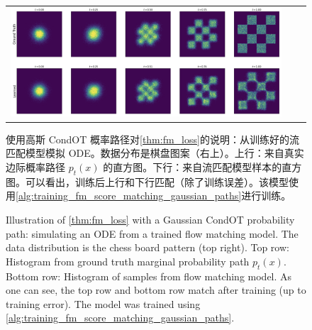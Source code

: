 \begin{figure}[!t]
    \centering
    \begin{tabular}{ccc}
         \includegraphics[width=\textwidth]{figures/conditional_marginal_path.png} &
    \end{tabular}
    \caption{\label{fig:fm_illustration_checkerboard}Illustration of \cref{thm:fm_loss} with a Gaussian CondOT probability path: simulating an ODE from a trained flow matching model. The data distribution is the chess board pattern (top right). Top row: Histogram from ground truth marginal probability path $p_t(x)$. Bottom row: Histogram of samples from flow matching model. As one can see, the top row and bottom row match after training (up to training error). The model was trained using \cref{alg:training_fm_score_matching_gaussian_paths}.}

使用高斯 CondOT 概率路径对\cref{thm:fm_loss}的说明：从训练好的流匹配模型模拟 ODE。数据分布是棋盘图案（右上）。上行：来自真实边际概率路径 $p_t(x)$ 的直方图。下行：来自流匹配模型样本的直方图。可以看出，训练后上行和下行匹配（除了训练误差）。该模型使用\cref{alg:training_fm_score_matching_gaussian_paths}进行训练。
\end{figure}

